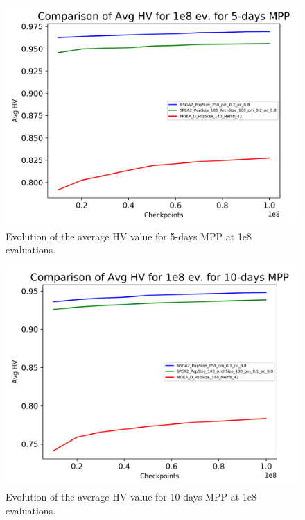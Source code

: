 \begin{figure}[H]
  \centering
  \includegraphics[width=1.0\linewidth]{../experiments/plots/avg_evolution_5_days.png}
\caption{Evolution of the average HV value for 5-days MPP at 1e8 evaluations.}
\label{fig:previous_HV_5}
\end{figure}

\begin{figure}[H]
  \centering
  \includegraphics[width=1.0\linewidth]{../experiments/plots/avg_evolution_10_days.png}
\caption{Evolution of the average HV value for 10-days MPP at 1e8 evaluations.}
\label{fig:previous_HV_10}
\end{figure}

